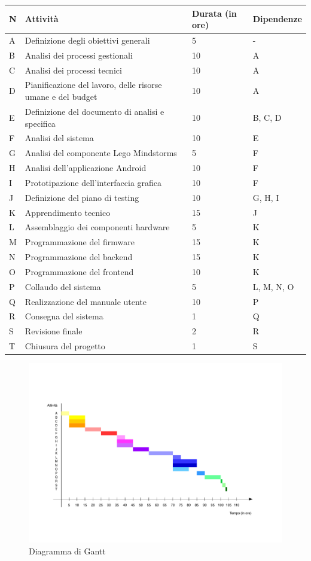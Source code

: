 \documentclass{article}
\begin{document}
  \begin{longtable}[]{@{}llll@{}}
  \toprule
  N & Attività & Durata (in ore) & Dipendenze\tabularnewline
  \midrule
  \endhead
  A & Definizione degli obiettivi generali & 5 & -\tabularnewline
  B & Analisi dei processi gestionali & 10 & A\tabularnewline
  C & Analisi dei processi tecnici & 10 & A\tabularnewline
  D & Pianificazione del lavoro, delle risorse umane e del budget & 10 &
  A\tabularnewline
  E & Definizione del documento di analisi e specifica & 10 & B, C,
  D\tabularnewline
  F & Analisi del sistema & 10 & E\tabularnewline
  G & Analisi del componente Lego Mindstorms & 5 & F\tabularnewline
  H & Analisi dell'applicazione Android & 10 & F\tabularnewline
  I & Prototipazione dell'interfaccia grafica & 10 & F\tabularnewline
  J & Definizione del piano di testing & 10 & G, H, I\tabularnewline
  K & Apprendimento tecnico & 15 & J\tabularnewline
  L & Assemblaggio dei componenti hardware & 5 & K\tabularnewline
  M & Programmazione del firmware & 15 & K\tabularnewline
  N & Programmazione del backend & 15 & K\tabularnewline
  O & Programmazione del frontend & 10 & K\tabularnewline
  P & Collaudo del sistema & 5 & L, M, N, O\tabularnewline
  Q & Realizzazione del manuale utente & 10 & P\tabularnewline
  R & Consegna del sistema & 1 & Q\tabularnewline
  S & Revisione finale & 2 & R\tabularnewline
  T & Chiusura del progetto & 1 & S\tabularnewline
  \bottomrule
  \end{longtable}
  
  \begin{figure}[htbp]
  \centering
  \includegraphics[trim={0 4cm 0 4cm},clip,width=16cm]{Gantt.pdf}
  \caption{Diagramma di Gantt}
  \end{figure}
  
\end{document}
